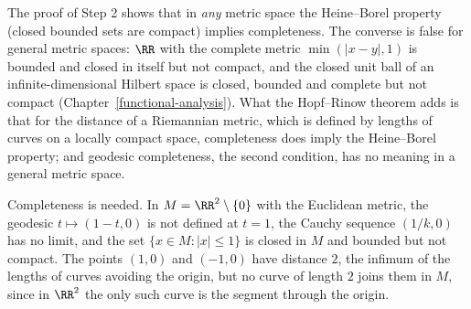 \begin{remark}\label{riemannian-geometry:remark-heine-borel}
The proof of Step 2 shows that in \emph{any} metric space the Heine--Borel property (closed bounded sets are compact) implies completeness. The converse is false for general metric spaces: $\RR$ with
the complete metric $\min(|x - y|, 1)$ is bounded and closed in itself but not compact, and the closed unit ball of an infinite-dimensional Hilbert space is closed, bounded and complete but not
compact (Chapter~\ref{functional-analysis}). What the Hopf--Rinow theorem adds is that for the distance of a Riemannian metric, which is defined by lengths of curves on a locally compact space,
completeness does imply the Heine--Borel property; and geodesic completeness, the second condition, has no meaning in a general metric space.
\end{remark}

\begin{counterexample}\label{riemannian-geometry:counterexample-incomplete}
Completeness is needed. In $M = \RR^2 \setminus \{0\}$ with the Euclidean metric, the geodesic $t \mapsto (1 - t, 0)$ is not defined at $t = 1$, the Cauchy sequence $(1/k, 0)$ has no limit, and the set $\{x \in M : |x| \leq 1\}$ is closed in $M$
and bounded but not compact. The points $(1, 0)$ and $(-1, 0)$ have distance $2$, the infimum of the lengths of curves avoiding the origin, but no
curve of length $2$ joins them in $M$, since in $\RR^2$ the only such curve is the segment through the origin.
\end{counterexample}

